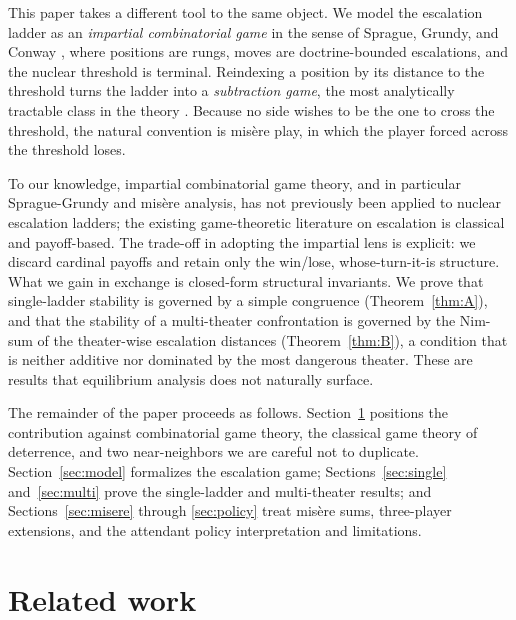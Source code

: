 \documentclass[11pt]{article}
\theoremstyle{plain}
\theoremstyle{definition}
\theoremstyle{remark}
\begin{document}
This paper takes a different tool to the same object. We model the
escalation ladder as an \emph{impartial combinatorial game} in the sense of
Sprague, Grundy, and Conway \citep{sprague1935, grundy1939, conway1976,
bcg1982}, where positions are rungs, moves are doctrine-bounded escalations,
and the nuclear threshold is terminal. Reindexing a position by its distance
to the threshold turns the ladder into a \emph{subtraction game}, the most
analytically tractable class in the theory \citep{guysmith1956}. Because no
side wishes to be the one to cross the threshold, the natural convention is
mis\`ere play, in which the player forced across the threshold loses.

To our knowledge, impartial combinatorial game theory, and in particular
Sprague-Grundy and mis\`ere analysis, has not previously been applied to
nuclear escalation ladders; the existing game-theoretic literature on
escalation is classical and payoff-based. The trade-off in adopting the
impartial lens is explicit: we discard cardinal payoffs and retain only the
win/lose, whose-turn-it-is structure. What we gain in exchange is
closed-form structural invariants. We prove that single-ladder stability is
governed by a simple congruence (Theorem~\ref{thm:A}), and that the
stability of a multi-theater confrontation is governed by the Nim-sum of the
theater-wise escalation distances (Theorem~\ref{thm:B}), a condition that is
neither additive nor dominated by the most dangerous theater. These are
results that equilibrium analysis does not naturally surface.

The remainder of the paper proceeds as follows. Section~\ref{sec:related}
positions the contribution against combinatorial game theory, the classical
game theory of deterrence, and two near-neighbors we are careful not to
duplicate. Section~\ref{sec:model} formalizes the escalation game;
Sections~\ref{sec:single} and~\ref{sec:multi} prove the single-ladder and
multi-theater results; and Sections~\ref{sec:misere} through
\ref{sec:policy} treat mis\`ere sums, three-player extensions, and the
attendant policy interpretation and limitations.

\section{Related work}\label{sec:related}
\end{document}
